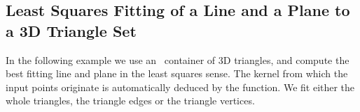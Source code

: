 \subsection{Least Squares Fitting of a Line and a Plane to a 3D Triangle Set}
In the following example we use an \stl\ container of 3D triangles, and compute the best fitting line and plane in the least squares sense. The kernel from which the input points originate is automatically deduced by the function. We fit either the whole triangles, the triangle edges or the triangle vertices.

